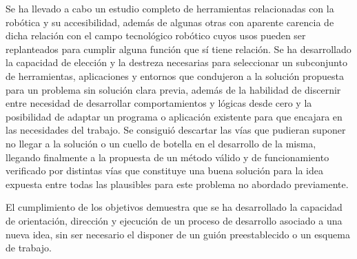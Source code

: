 Se ha llevado a cabo un estudio completo de herramientas relacionadas con la robótica y su accesibilidad, además de algunas otras con aparente carencia de dicha relación con el campo tecnológico robótico cuyos usos pueden ser replanteados para cumplir alguna función que sí tiene relación. Se ha desarrollado la capacidad de elección y la destreza necesarias para seleccionar un subconjunto de herramientas, aplicaciones y entornos que condujeron a la solución propuesta para un problema sin solución clara previa, además de la habilidad de discernir entre necesidad de desarrollar comportamientos y lógicas desde cero y la posibilidad de adaptar un programa o aplicación existente para que encajara en las necesidades del trabajo. Se consiguió descartar las vías que pudieran suponer no llegar a la solución o un cuello de botella en el desarrollo de la misma, llegando finalmente a la propuesta de un método válido y de funcionamiento verificado por distintas vías que constituye una buena solución para la idea expuesta entre todas las plausibles para este problema no abordado previamente.

El cumplimiento de los objetivos demuestra que se ha desarrollado la capacidad de orientación, dirección y ejecución de un proceso de desarrollo asociado a una nueva idea, sin ser necesario el disponer de un guión preestablecido o un esquema de trabajo.

